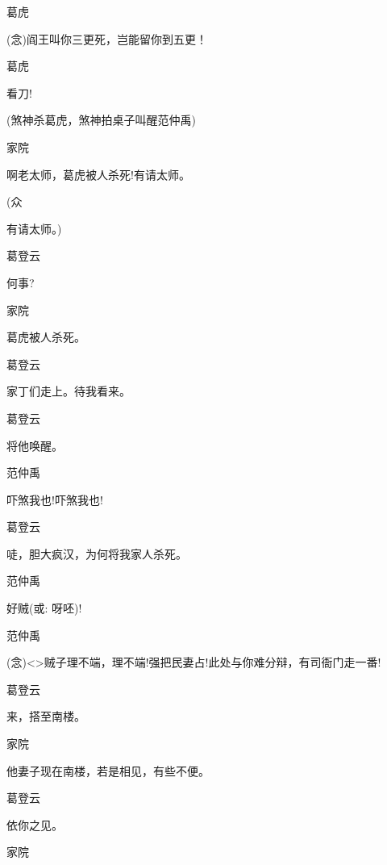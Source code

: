 葛虎\hspace{30pt}~

({\akai 念})阎王叫你三更死，岂能留你到五更！

葛虎\hspace{30pt}~

看刀!

(煞神杀葛虎，煞神拍桌子叫醒范仲禹)

家院\hspace{30pt}~

啊老太师，葛虎被人杀死!有请太师。

(众\hspace{40pt}~

有请太师。)

葛登云\hspace{20pt}~

何事?

家院\hspace{30pt}~

葛虎被人杀死。

葛登云\hspace{20pt}~

家丁们走上。待我看来。

葛登云\hspace{20pt}~

将他唤醒。

范仲禹\hspace{20pt}~

吓煞我也!吓煞我也!

葛登云\hspace{20pt}~

唗，胆大疯汉，为何将我家人杀死。

范仲禹\hspace{20pt}~

好贼({\akai 或}: 呀呸)!

范仲禹

({\akai 念})\textless{}\!\textgreater{}贼子理不端，理不端!强把民妻占!此处与你难分辩，有司衙门走一番!

葛登云\hspace{20pt}~

来，搭至南楼。

家院\hspace{30pt}~

他妻子现在南楼，若是相见，有些不便。

葛登云\hspace{20pt}~

依你之见。

家院\hspace{30pt}~


